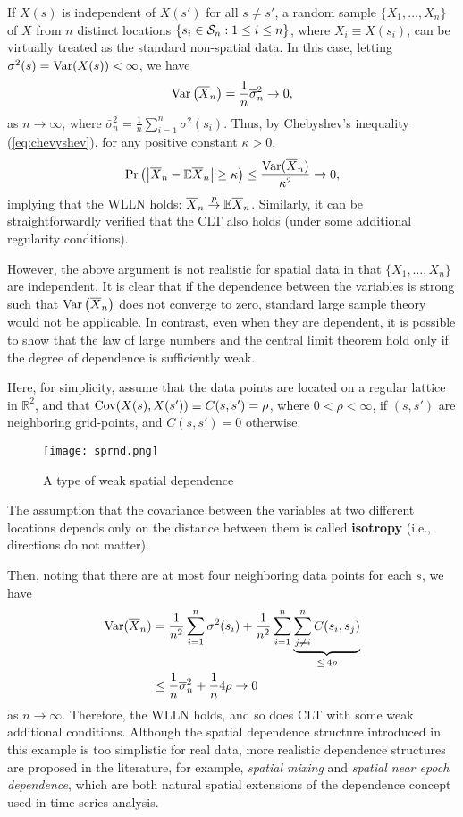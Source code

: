 \documentclass[11pt, A4paper, openany, uplatex]{book}
\begin{document}
If $X(s)$ is independent of $X(s')$ for all $s \neq s'$, a random sample $\{X_1, \ldots, X_n\}$ of $X$ from $n$ distinct locations $\{s_i \in \mathcal{S}_n: 1 \le i \le n\}$, where $X_i \equiv X(s_i)$, can be virtually treated as the standard non-spatial data.
In this case, letting $\sigma^2(s) = \mathrm{Var}(X(s)) < \infty$, we have
\[
	\mathrm{Var}\left( \overline X_n\right) = \frac{1}{n} \overline{\sigma}^2_n \to 0,
\]
as $n \to \infty$, where $\bar{\sigma}^2_n = \frac{1}{n}\sum_{i=1}^n \sigma^2(s_i)$.
Thus, by Chebyshev's inequality (\ref{eq:chevyshev}), for any positive constant $\kappa >0$,
\[
	\Pr\left( \left| \overline X_n - \mathbb{E} \overline X_n \right| \ge \kappa \right) \le \frac{\mathrm{Var}(\overline X_n)}{\kappa^2} \to 0,
\]
implying that the WLLN holds: $\overline X_n \overset{p}{\to} \mathbb{E} \overline X_n$. 
Similarly, it can be straightforwardly verified that the CLT also holds (under some additional regularity conditions).

However, the above argument is not realistic for spatial data in that $\{X_1, \ldots, X_n\}$ are independent.
It is clear that if the dependence between the variables is strong such that $\mathrm{Var}\left( \overline X_n\right)$ does not converge to zero, standard large sample theory would not be applicable.
In contrast, even when they are dependent, it is possible to show that the law of large numbers and the central limit theorem hold only if the degree of dependence is sufficiently weak.

Here, for simplicity, assume that the data points are located on a regular lattice in $\mathbb{R}^2$, and that $\mathrm{Cov}(X(s), X(s')) \equiv C(s, s') = \rho$, where $0 < \rho < \infty$, if $(s, s')$ are neighboring grid-points, and $C(s, s') = 0$ otherwise.

\begin{figure}[h!]
	\begin{center}
		\texttt{[image: sprnd.png]}
		\caption{A type of weak spatial dependence}
	\end{center}
\end{figure}

The assumption that the covariance between the variables at two different locations depends only on the distance between them is called \textbf{isotropy} (i.e., directions do not matter).

Then, noting that there are at most four neighboring data points for each $s$, we have
\begin{align*}
	\mathrm{Var}(\overline X_n) 
	& = \frac{1}{n^2}\sum_{i=1}^n \sigma^2(s_i) + \frac{1}{n^2}\sum_{i = 1}^n \underbrace{\sum_{j \neq i}^n C(s_i, s_j)}_{\le \: 4\rho} \\
	& \le \frac{1}{n}\overline{\sigma}_n^2 + \frac{1}{n} 4 \rho \to 0
\end{align*}
as $n \to \infty$.
Therefore, the WLLN holds, and so does CLT with some weak additional conditions.
Although the spatial dependence structure introduced in this example is too simplistic for real data, more realistic dependence structures are proposed in the literature, for example, \textit{spatial mixing} and \textit{spatial near epoch dependence}, which are both natural spatial extensions of the dependence concept used in time series analysis.
\end{document}

